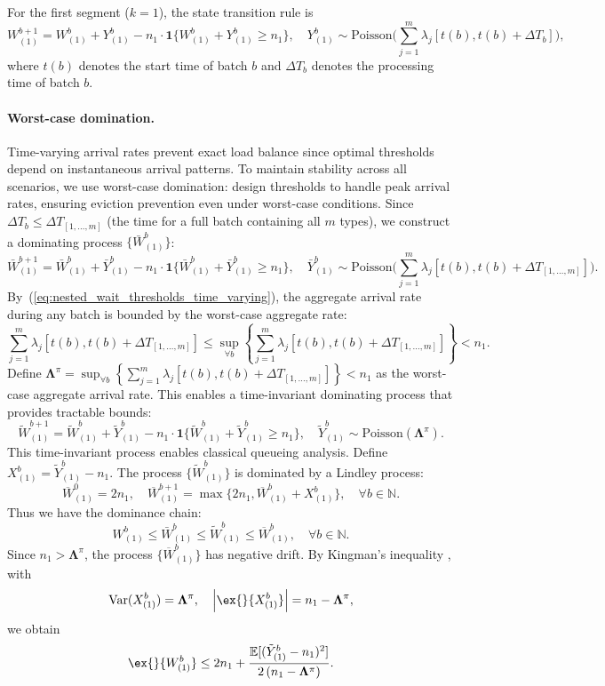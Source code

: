 For the first segment ($k=1$), the state transition rule is
$$ W_{(1)}^{b+1} = W_{(1)}^{b} + Y_{(1)}^b  - n_1 \cdot \mathbf{1}\{ W_{(1)}^{b} + Y_{(1)}^b \geq n_1 \},  \quad Y_{(1)}^b \sim \text{Poisson}\Big( \sum_{j=1}^m \lambda_j[t(b), t(b)+ \Delta T_b] \Big),  $$
where $t(b)$ denotes the start time of batch $b$ and $\Delta T_b$ denotes the processing time of batch $b$.

\paragraph{Worst-case domination.} Time-varying arrival rates prevent exact load balance since optimal thresholds depend on instantaneous arrival patterns. To maintain stability across all scenarios, we use worst-case domination: design thresholds to handle peak arrival rates, ensuring eviction prevention even under worst-case conditions. Since $\Delta T_b\leq \Delta T_{[1,\dots,m]}$ (the time for a full batch containing all $m$ types), we construct a dominating process $\{\bar{W}_{(1)}^{b}\}$:
$$ \bar{W}_{(1)}^{b+1} = \bar{W}_{(1)}^{b} + \bar{Y}_{(1)}^b  - n_1 \cdot \mathbf{1}\{ \bar{W}_{(1)}^{b} + \bar{Y}_{(1)}^b \geq n_1 \},  \quad \bar{Y}_{(1)}^b \sim \text{Poisson}\Big(  \sum_{j=1}^m \lambda_j[t(b), t(b)+\Delta T_{[1,\dots,m]}] \Big).  $$
By~(\ref{eq:nested_wait_thresholds_time_varying}), the aggregate arrival rate during any batch is bounded by the worst-case aggregate rate:
$$ \sum_{j=1}^m \lambda_j[t(b), t(b)+\Delta T_{[1,\dots,m]}] \leq \sup_{\forall b}\left\{\sum_{j=1}^m \lambda_j[t(b), t(b)+\Delta T_{[1,\dots,m]}] \right\} < n_1.$$
Define $\mathbf{\Lambda}^{\pi} = \sup_{\forall b}\left\{\sum_{j=1}^m \lambda_j[t(b), t(b)+\Delta T_{[1,\dots,m]}] \right\} < n_1$ as the worst-case aggregate arrival rate. This enables a time-invariant dominating process that provides tractable bounds:
$$ \tilde{W}_{(1)}^{b+1} = \tilde{W}_{(1)}^{b} + \tilde{Y}_{(1)}^b  - n_1 \cdot \mathbf{1}\{ \tilde{W}_{(1)}^{b} + \tilde{Y}_{(1)}^b \geq n_1 \},  \quad \tilde{Y}_{(1)}^b \sim \text{Poisson}(\mathbf{\Lambda}^{\pi}).  $$
This time-invariant process enables classical queueing analysis. Define $X_{(1)}^b = \tilde{Y}_{(1)}^b - n_1$. The process $\{ \tilde{W}_{(1)}^{b}\}$ is dominated by a Lindley process:
$$ \overline{W}_{(1)}^{0} = 2n_1,\quad  \overline{W}_{(1)}^{b+1} = \max \{  2n_1, \overline{W}_{(1)}^{b} + X_{(1)}^b \},\quad \forall b \in \mathbb{N}. $$
Thus we have the dominance chain:
$$ W_{(1)}^{b}\leq \bar{W}_{(1)}^{b} \leq \tilde{W}_{(1)}^{b} \leq \overline{W}_{(1)}^{b}, \quad \forall b \in \mathbb{N}.$$
Since $n_1> \mathbf{\Lambda}^{\pi}$, the process $\{\overline{W}_{(1)}^{b} \}$ has negative drift. By Kingman's inequality \citep{kingman1962queues}, with
$$\text{Var}(X_{(1)}^b ) = \mathbf{\Lambda}^{\pi},\quad \left|  \ex{}{X_{(1)}^b} \right| = n_1 - \mathbf{\Lambda}^{\pi},$$
we obtain
$$  \ex{}{W_{(1)}^b}\leq  2n_1 + \frac{\mathbb{E}[(\tilde{Y}_{(1)}^b-n_1)^2]}{2\left(n_1 -\mathbf{\Lambda}^{\pi}\right)}. $$

